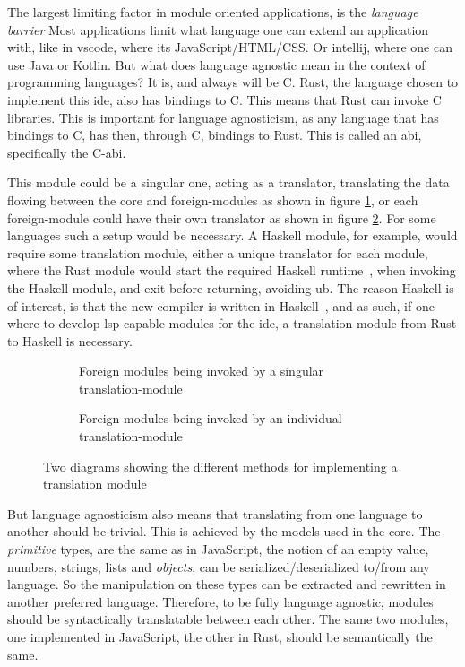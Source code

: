 The largest limiting factor in module oriented applications, is the
\textit{language barrier} Most applications limit what language one can extend
an application with, like in \gls*{vscode}, where its JavaScript/HTML/CSS. Or
\gls*{intellij}, where one can use Java or Kotlin. But what does language agnostic
mean in the context of programming languages? It is, and always will be C. Rust,
the language chosen to implement this \gls*{ide}, also has bindings to C. This
means that Rust can invoke C libraries. This is important for language
agnosticism, as any language that has bindings to C, has then, through C,
bindings to Rust. This is called an \gls*{abi}, specifically the C-\gls*{abi}.

This module could be a singular one, acting as a translator, translating the
data flowing between the core and foreign-modules as shown in figure
\ref{fig:fm1}, or each foreign-module could have their own translator as shown
in figure \ref{fig:fm2}. For some languages such a setup would be necessary.
A Haskell module, for example, would require some translation module, either a
unique translator for each module, where the Rust module would start the
required Haskell runtime~\cite{ghcRts}, when invoking the Haskell module, and
exit before returning, avoiding \gls*{ub}. The reason Haskell is of interest,
is that the new compiler is written in Haskell~\cite{wiig}, and as such, if one
where to develop \gls*{lsp} capable modules for the \gls*{ide}, a translation
module from Rust to Haskell is necessary.

\begin{figure}[H]
  \begin{subfigure}[h]{0.49\linewidth}
    
    \caption{Foreign modules being invoked by a singular translation-module}
    \label{fig:fm1}
  \end{subfigure}
  \hfill
  \begin{subfigure}[h]{0.49\linewidth}
    
    \caption{Foreign modules being invoked by an individual translation-module}
    \label{fig:fm2}
  \end{subfigure}
  \caption{
    Two diagrams showing the different methods for implementing a translation
    module
  }
  \label{fig:fm}
\end{figure}

But language agnosticism also means that translating from one language to
another should be trivial. This is achieved by the models used in the core. The
\textit{primitive} types, are the same as in JavaScript, the notion of an empty
value, numbers, strings, lists and \textit{objects}, can be
serialized/deserialized to/from any language. So the manipulation on these types
can be extracted and rewritten in another preferred language. Therefore, to be
fully language agnostic, modules should be syntactically translatable between
each other. The same two modules, one implemented in JavaScript, the other in
Rust, should be semantically the same.

